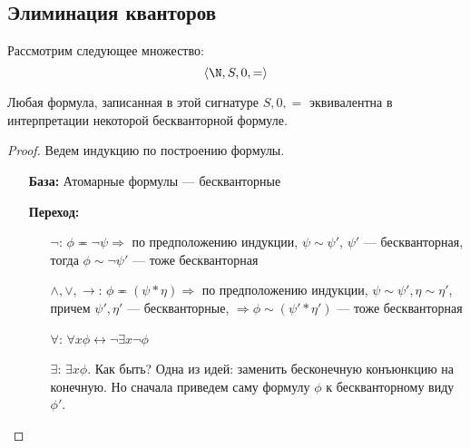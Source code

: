 
\subsection{Элиминация кванторов}
Рассмотрим следующее множество:
$$\langle \N, S, 0, =\rangle$$

\begin{theorem}
    Любая формула, записанная в этой сигнатуре $S, 0, =$ эквивалентна в интерпретации некоторой бескванторной формуле.
\end{theorem}
\begin{proof}
    Ведем индукцию по построению формулы. 
    \begin{enumerate}
        \item[] \textbf{База:} Атомарные формулы --- бескванторные
        \item[] \textbf{Переход:}
        \begin{enumerate}
            \item[$\neg$:] $\phi \eqcirc \neg\psi \Rightarrow$ по предположению индукции, $\psi \sim \psi'$, $\psi'$ --- бескванторная, тогда $\phi \sim \neg\psi'$ --- тоже бескванторная
            \item[$\wedge, \vee, \rightarrow$:] $\phi \eqcirc (\psi * \eta) \Rightarrow$ по предположению индукции, $\psi \sim \psi', \eta \sim \eta'$, причем $\psi', \eta'$ --- бескванторные, $\Rightarrow \phi \sim (\psi' * \eta')$  --- тоже бескванторная
            \item[$\forall$:] $\forall x \phi \leftrightarrow \neg \exists x \neg \phi$
            \item[$\exists$:] $\exists x \phi$. Как быть? Одна из идей: заменить бесконечную конъюнкцию на конечную. Но сначала приведем саму формулу $\phi$ к бескванторному виду $\phi'$.


\end{enumerate}
\end{enumerate}
\end{proof}
